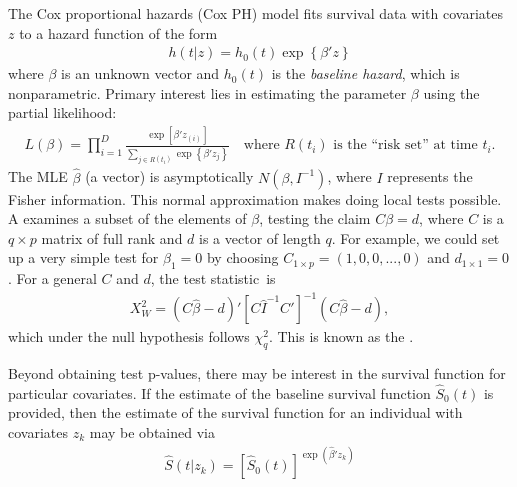 \documentclass[11pt]{article}
\begin{document}
The Cox proportional hazards (Cox PH) model fits survival data with covariates $z$ to a hazard function of the form
\begin{eqnarray*}
h(t|z) = h_0(t)\exp\left\{ \beta'z  \right\}
\end{eqnarray*}
where $\beta$ is an unknown vector and $h_0(t)$ is the \textit{baseline hazard}, which is nonparametric. Primary interest lies in estimating the parameter $\beta$ using the partial likelihood:
\begin{eqnarray*}
L(\beta) = \prod_{i=1}^D \frac{\exp\left[\beta'z_{(i)}\right]}{\sum_{j \in R(t_i)}\exp\left\{\beta'z_j\right\}}
		\quad
		\text{where }R(t_i)\text{ is the ``risk set'' at time }t_i.
\end{eqnarray*}
The MLE $\hat{\beta}$ (a vector) is asymptotically $N(\beta, I^{-1})$, where $I$ represents the Fisher information. This normal approximation makes doing local tests possible. A  examines a subset of the elements of $\beta$, testing the claim $C\beta = d$, where $C$ is a $q\times p$ matrix of full rank and $d$ is a vector of length $q$. For example, we could set up a very simple test for $\beta_1=0$ by choosing $C_{1 \times p}=(1,0,0,...,0)$ and $d_{1 \times 1}=0$. For a general $C$ and $d$, the test statistic~is
\begin{eqnarray*}
X_W^2 = \left(C\hat{\beta} - d\right)'\left[C\hat{I}^{-1}C'\right]^{-1}\left(C\hat{\beta} - d\right),
\end{eqnarray*}
which under the null hypothesis follows $\chi^2_q$. This is known as the .

Beyond obtaining test p-values, there may be interest in the survival function for particular covariates. If the estimate of the baseline survival function $\hat{S}_0(t)$ is provided, then the estimate of the survival function for an individual with covariates $z_k$ may be obtained via
\begin{eqnarray*}
\hat{S}(t|z_k) = \left[\hat{S}_0(t)\right]^{\exp\left(\hat{\beta}'z_k \right)}
\end{eqnarray*} 
\end{document}
